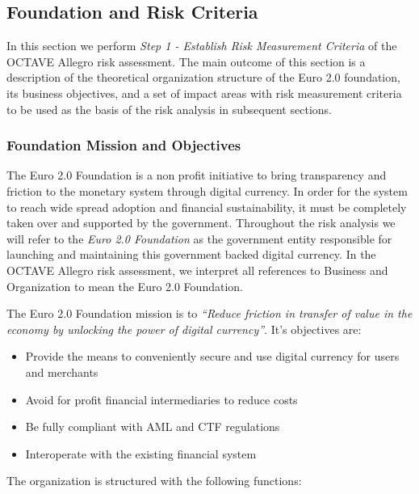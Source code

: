 \documentclass[12pt]{article} %
\begin{document}
{\subsection{Foundation and Risk Criteria} \label{ssec:5.1}
In this section we perform \textit{Step 1 - Establish Risk Measurement Criteria} of the OCTAVE Allegro risk assessment. The main outcome of this section is a description of the theoretical organization structure of the Euro 2.0 foundation, its business objectives, and a set of impact areas with risk measurement criteria to be used as the basis of the risk analysis in subsequent sections.

\subsubsection{Foundation Mission and Objectives} \label{sssec:5.1:objectives}

The Euro 2.0 Foundation is a non profit initiative to bring transparency and friction to the monetary system through digital currency. In order for the system to reach wide spread adoption and financial sustainability, it must be completely taken over and supported by the government. Throughout the risk analysis we will refer to the \textit{Euro 2.0 Foundation} as the government entity responsible for launching and maintaining this government backed digital currency. In the OCTAVE Allegro risk assessment, we interpret all references to Business and Organization to mean the Euro 2.0 Foundation.

The Euro 2.0 Foundation mission is to \textit{``Reduce friction in transfer of value in the economy by unlocking the power of digital currency''}. It's objectives are:

\begin{itemize}
	\item Provide the means to conveniently secure and use digital currency for users and merchants
	\item Avoid for profit financial intermediaries to reduce costs
	\item Be fully compliant with AML and CTF regulations
	\item Interoperate with the existing financial system
\end{itemize}

The organization is structured with the following functions:

}
\end{document}
